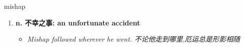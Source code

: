 
\begin{frame}
{\huge mishap}
\begin{center}
\begin{enumerate}\Large
  \item \textbf{n. 不幸之事: an unfortunate accident}
  \begin{itemize}
    \item \em{\Large{Mishap followed wherever he went. 不论他走到哪里,厄运总是形影相随}}
  \end{itemize}
\end{enumerate}
\end{center}
\end{frame}
